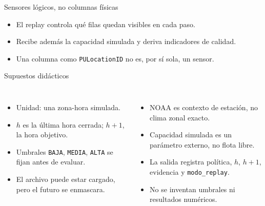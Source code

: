 \documentclass[aspectratio=169,11pt]{beamer}
\begin{document}
\begin{frame}{Sensores lógicos, no columnas físicas}
  \centering
  \vfill
  \begin{itemize}
    \item El replay controla qué filas quedan visibles en cada paso.
    \item Recibe además la capacidad simulada y deriva indicadores de calidad.
    \item Una columna como \texttt{PULocationID} no es, por sí sola, un sensor.
  \end{itemize}
\end{frame}

\begin{frame}{Supuestos didácticos}
  \begin{columns}[T]
      \begin{itemize}
        \item Unidad: una zona-hora simulada.
        \item $h$ es la última hora cerrada; $h+1$, la hora objetivo.
        \item Umbrales \texttt{BAJA}, \texttt{MEDIA}, \texttt{ALTA} se fijan antes de evaluar.
        \item El archivo puede estar cargado, pero el futuro se enmascara.
      \end{itemize}
      \begin{itemize}
        \item NOAA es contexto de estación, no clima zonal exacto.
        \item Capacidad simulada es un parámetro externo, no flota libre.
        \item La salida registra política, $h$, $h+1$, evidencia y \texttt{modo\_replay}.
        \item No se inventan umbrales ni resultados numéricos.
      \end{itemize}
  \end{columns}
\end{frame}
\end{document}
